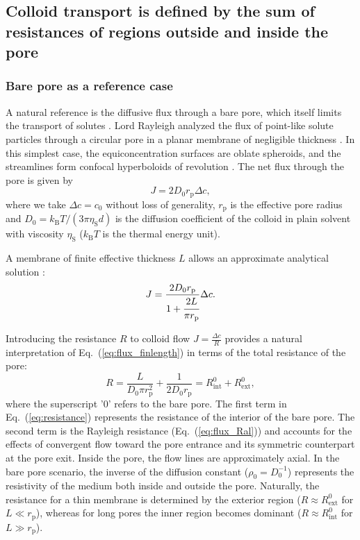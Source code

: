 \documentclass[12pt, a4paper]{article}
\begin{document}
\subsection{Colloid transport is defined by the sum of resistances of regions outside and inside the pore}

\subsubsection{Bare pore as a reference case}

A natural reference is the diffusive flux through a bare pore, which itself limits the transport of solutes \cite{Deen1987, Sun2024}.
Lord Rayleigh analyzed the flux of point-like solute particles through a circular pore in a planar membrane of negligible thickness \cite{Strutt1878}.
In this simplest case, the equiconcentration surfaces are oblate spheroids, and the streamlines form confocal hyperboloids of revolution \cite{Cooke1966}.
The net flux through the pore is given by
\begin{equation}
    J=2D_0r_{\text{p}}\Delta c,
    \label{eq:flux_Ral}
\end{equation}
where we take $\Delta c = c_0$ without loss of generality, $r_{\text{p}}$ is the effective pore radius and $D_0 = k_{\text{B}}T / (3 \pi \eta_{\text{S}} d)$ is the diffusion coefficient of the colloid in plain solvent with viscosity $\eta_{\text{S}}$ ($k_{\text{B}}T$ is the thermal energy unit).

A membrane of finite effective thickness $L$ allows an approximate analytical solution \cite{Brunn1984}:
\begin{equation}
    J=\frac{2 D_0 r_{\text{p}}}{1+\cfrac{2L}{\pi r_{\text{p}}}}\Delta c.
    \label{eq:flux_finlength}
\end{equation}

Introducing the resistance $R$ to colloid flow $J = \frac{\Delta c}{R}$ provides a natural interpretation of Eq.~(\ref{eq:flux_finlength}) in terms of the total resistance of the pore:
\begin{equation}
    R = \frac{L}{D_0 \pi r_{\text{p}}^{2}} + \frac{1}{2 D_0 r_{\text{p}}} = R_{\text{int}}^{0} + R_{\text{ext}}^{0},
    \label{eq:resistance}
\end{equation}
where the superscript '0' refers to the bare pore.
The first term in Eq.~(\ref{eq:resistance}) represents the resistance of the interior of the bare pore.
The second term is the Rayleigh resistance (Eq.~(\ref{eq:flux_Ral})) and accounts for the effects of convergent flow toward the pore entrance and its symmetric counterpart at the pore exit.
Inside the pore, the flow lines are approximately axial.
In the bare pore scenario, the inverse of the diffusion constant ($\rho_0=D_0^{-1}$) represents the resistivity of the medium both inside and outside the pore.
Naturally, the resistance for a thin membrane is determined by the exterior region ($R \approx R_{\text{ext}}^{0}$ for $L \ll r_{\text{p}}$), whereas for long pores the inner region becomes dominant ($R \approx R_{\text{int}}^{0}$ for $L \gg r_{\text{p}}$).
\end{document}
